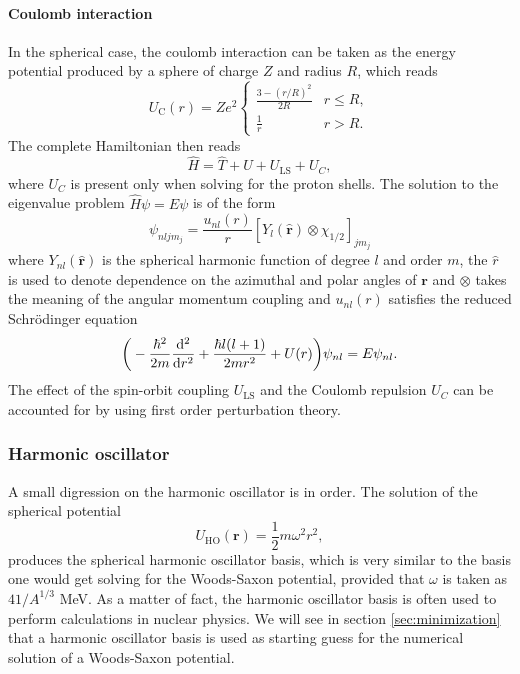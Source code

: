 \paragraph{Coulomb interaction}
In the spherical case, the coulomb interaction can be taken as the energy potential produced by a sphere of charge $Z$ and radius $R$, which reads
\begin{equation}
    U_{\text{C}}(r) = Ze^2
    \begin{cases}
        \frac{3-(r/R)^2}{2R} & r \le R, \\
        \frac 1 r & r > R.
    \end{cases}
\end{equation}
The complete Hamiltonian then reads
\begin{equation}
    \hat H = \hat T + U + U_{\text{LS}}+U_C,
\end{equation}
where $U_C$ is present only when solving for the proton shells. The solution to the eigenvalue problem $\hat H \psi = E\psi$ is of the form
\begin{equation}
   \psi_{nljm_j} = \frac{u_{nl}(r)}{r}[Y_{l}(\hat {\bm r})\otimes \chi_{1/2}]_{jm_j} 
\end{equation}
where $Y_{nl}(\hat {\bm r})$ is the spherical harmonic function of degree $l$ and order $m$, the $\hat r$ is used to denote dependence on the azimuthal and polar angles of $\bm r$ and $\otimes$ takes the meaning of the angular momentum coupling and $u_{nl}(r)$ satisfies the reduced Schr\"odinger equation
\begin{equation}
    \label{eq:red}
    \bigg(-\frac {\hbar^2}{2m}\dv[2]{r}+\frac{\hbar l(l+1)}{2mr^2}+U(r)\bigg)\psi_{nl} = E\psi_{nl}.
\end{equation}
The effect of the spin-orbit coupling $U_{\text{LS}}$ and the Coulomb repulsion $U_C$ can be accounted for by using first order perturbation theory.
\subsubsection{Harmonic oscillator}
A small digression on the harmonic oscillator is in order. The solution of the spherical potential 
\begin{equation}
U_{\text{HO}} (\bm r ) = \frac 1 2 m\omega^2 r^ 2,
\end{equation}
produces the spherical harmonic oscillator basis, which is very similar to the basis one would get solving for the Woods-Saxon potential, provided that $\omega$ is taken as $41/A^{1/3}$ MeV. As a matter of fact, the harmonic oscillator basis is often used to perform calculations in nuclear physics. We will see in section \ref{sec:minimization} that a harmonic oscillator basis is used as starting guess for the numerical solution of a Woods-Saxon potential.
